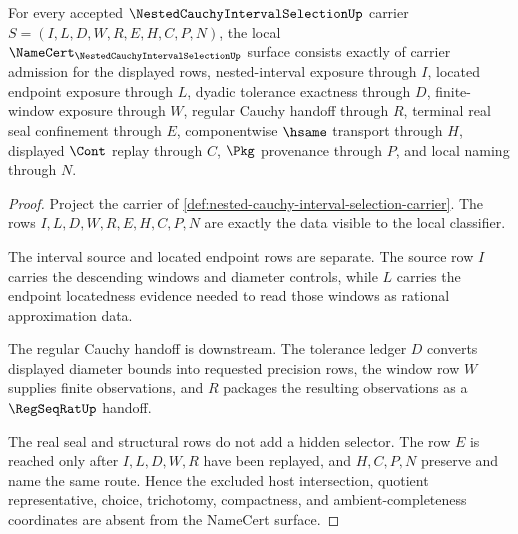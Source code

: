 \begin{theorem}
\label{thm:nested-cauchy-interval-selection-namecert-obligations}
For every accepted $\NestedCauchyIntervalSelectionUp$ carrier $S=(I,L,D,W,R,E,H,C,P,N)$, the local $\NameCert_{\NestedCauchyIntervalSelectionUp}$ surface consists exactly of carrier admission for the displayed rows, nested-interval exposure through $I$, located endpoint exposure through $L$, dyadic tolerance exactness through $D$, finite-window exposure through $W$, regular Cauchy handoff through $R$, terminal real seal confinement through $E$, componentwise $\hsame$ transport through $H$, displayed $\Cont$ replay through $C$, $\Pkg$ provenance through $P$, and local naming through $N$.
\end{theorem}
\begin{proof}
Project the carrier of \autoref{def:nested-cauchy-interval-selection-carrier}. The rows $I,L,D,W,R,E,H,C,P,N$ are exactly the data visible to the local classifier.

The interval source and located endpoint rows are separate. The source row $I$ carries the descending windows and diameter controls, while $L$ carries the endpoint locatedness evidence needed to read those windows as rational approximation data.

The regular Cauchy handoff is downstream. The tolerance ledger $D$ converts displayed diameter bounds into requested precision rows, the window row $W$ supplies finite observations, and $R$ packages the resulting observations as a $\RegSeqRatUp$ handoff.

The real seal and structural rows do not add a hidden selector. The row $E$ is reached only after $I,L,D,W,R$ have been replayed, and $H,C,P,N$ preserve and name the same route. Hence the excluded host intersection, quotient representative, choice, trichotomy, compactness, and ambient-completeness coordinates are absent from the NameCert surface.
\end{proof}

